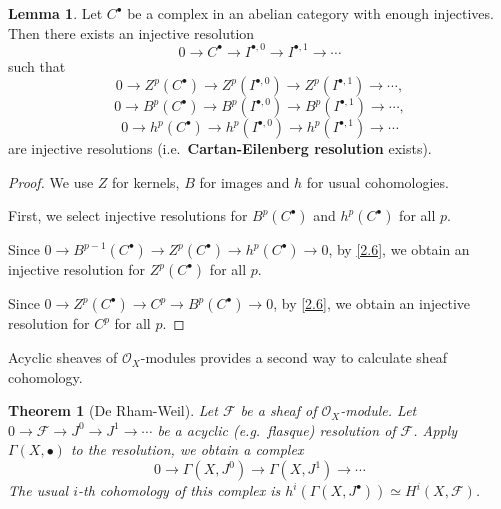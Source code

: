 \documentclass{amsart}
\numberwithin{equation}{section}
\theoremstyle{plain}
\newtheorem{thm}[equation]{Theorem}
\theoremstyle{definition}
\newtheorem{lem}[equation]{Lemma}
\begin{document}
\begin{lem}\label{2.7}
	Let $ C^{\bullet} $ be a complex in an abelian category with enough injectives. 
	Then there exists an injective resolution
	$$ 0\to C^{\bullet}\to I^{\bullet, 0}\to I^{\bullet, 1}\to \cdots $$
	such that 
	$$0\to  Z^p(C^{\bullet})\to  Z^p(I^{\bullet, 0})\to  Z^p(I^{\bullet, 1})\to \cdots, $$
	$$0\to  B^p(C^{\bullet})\to  B^p(I^{\bullet, 0})\to  B^p(I^{\bullet, 1})\to \cdots, $$
	$$0\to  h^p(C^{\bullet})\to  h^p(I^{\bullet, 0})\to  h^p(I^{\bullet, 1})\to \cdots $$
	are injective resolutions (i.e.~\textbf{Cartan-Eilenberg resolution} exists). 
\end{lem}

\begin{proof}
	We use $ Z $ for kernels, $ B $ for images and $ h $ for usual cohomologies.
	
	First, we select injective resolutions for $ B^p(C^{\bullet}) $ and $ h^p(C^{\bullet}) $ for all $ p $. 
	
	Since $ 0\to B^{p-1}(C^{\bullet})\to Z^p(C^{\bullet})\to h^p(C^{\bullet})\to 0 $, by \cref{2.6}, we obtain an injective resolution for $ Z^p(C^{\bullet}) $ for all $ p $. 
	
	Since $ 0\to Z^{p}(C^{\bullet})\to C^{p}\to B^p(C^{\bullet})\to 0 $, by \cref{2.6}, we obtain an injective resolution for $ C^p $ for all $ p $. 
\end{proof}


Acyclic sheaves of $ \mathcal O_X $-modules provides a second way to calculate sheaf cohomology. 
\begin{thm}[De Rham-Weil]\label{DW}
	Let $ \mathscr F $ be a sheaf of $ \mathcal O_X $-module.
	Let $ 0\to \mathscr F\to J^0\to J^1\to\cdots  $ be a acyclic (e.g.~flasque) resolution of $ \mathscr F $. 
	Apply $ \Gamma(X, \bullet) $ to the resolution, we obtain a complex 
	\[0\to \Gamma(X, J^0)\to \Gamma(X, J^1)\to\cdots \]
	The usual $ i $-th cohomology of this complex is $ h^i(\Gamma(X,J^{\bullet}))\simeq H^i(X, \mathscr F) $. 
\end{thm}
\end{document}
